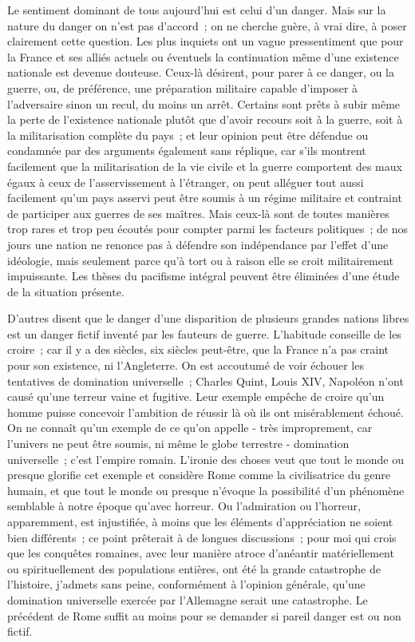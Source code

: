 \documentclass[french,twoside]{book} %
\begin{document}
Le sentiment dominant de tous aujourd'hui est celui d'un danger. Mais sur la nature du danger on n'est pas d'accord ; on ne cherche guère, à vrai dire, à poser clairement cette question. Les plus inquiets ont un vague pressentiment que pour la France et ses alliés actuels ou éventuels la continuation même d'une existence nationale est devenue douteuse. Ceux-là désirent, pour parer à ce danger, ou la guerre, ou, de préférence, une préparation militaire capable d'imposer à l'adversaire sinon un recul, du moins un arrêt. Certains sont prêts à subir même la perte de l'existence nationale plutôt que d'avoir recours soit à la guerre, soit à la militarisation complète du pays ; et leur opinion peut être défendue ou condamnée par des arguments également sans réplique, car s'ils montrent facilement que la militarisation de la vie civile et la guerre compor­tent des maux égaux à ceux de l'asservissement à l'étranger, on peut alléguer tout aussi facilement qu'un pays asservi peut être soumis à un régime militaire et contraint de participer aux guerres de ses maîtres. Mais ceux-là sont de toutes manières trop rares et trop peu écoutés pour compter parmi les facteurs politiques ; de nos jours une nation ne renonce pas à défendre son indépen­dance par l'effet d'une idéologie, mais seulement parce qu'à tort ou à raison elle se croit militairement impuissante. Les thèses du pacifisme intégral peuvent être éliminées d'une étude de la situation présente.\par
D'autres disent que le danger d'une disparition de plusieurs grandes nations libres est un danger fictif inventé par les fauteurs de guerre. L'habitude conseille de les croire ; car il y a des siècles, six siècles peut-être, que la France n'a pas craint pour son existence, ni l'Angleterre. On est accoutumé de voir échouer les tentatives de domination universelle ; Charles Quint, Louis XIV, Napoléon n'ont causé qu'une terreur vaine et fugitive. Leur exemple empêche de croire qu'un homme puisse concevoir l'ambition de réussir là où ils ont misérablement échoué. On ne connaît qu'un exemple de ce qu'on appelle - très improprement, car l'univers ne peut être soumis, ni même le globe terrestre - domination universelle ; c'est l'empire romain. L'ironie des choses veut que tout le monde ou presque glorifie cet exemple et considère Rome comme la civilisatrice du genre humain, et que tout le monde ou presque n'évoque la possibilité d'un phénomène semblable à notre époque qu'avec horreur. Ou l'admiration ou l'horreur, apparemment, est injustifiée, à moins que les éléments d'appréciation ne soient bien différents ; ce point prêterait à de longues discussions ; pour moi qui crois que les conquêtes romaines, avec leur manière atroce d'anéantir matériellement ou spirituelle­ment des populations entières, ont été la grande catastrophe de l'histoire, j'admets sans peine, conformément à l'opinion générale, qu'une domination universelle exercée par l'Allemagne serait une catastrophe. Le précédent de Rome suffit au moins pour se demander si pareil danger est ou non fictif.\par
\end{document}
